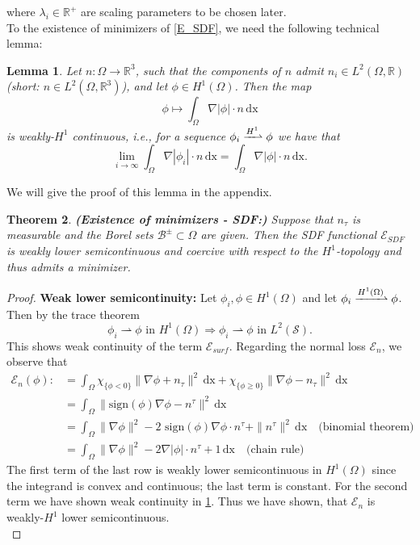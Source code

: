 \documentclass[12pt,openany]{book}
\newcommand{\R}{\mathbb{R}}
\def\S{\mathcal{S}}
\theoremstyle{plainnormal}
\newtheorem{theorem}{Theorem}[section]
\newtheorem{lemma}[theorem]{Lemma}
\theoremstyle{remark}
\begin{document}
where $\lambda_i\in\R^+$ are scaling parameters to be chosen later.\\
To the existence of minimizers of \eqref{E_SDF}, we need the following technical lemma: 
\begin{lemma}\label{technicalLemma}
    Let $n: \Omega \rightarrow \R^3$, such that the components of $n$ admit  $n_i\in L^2(\Omega, \R)$ (short: $n\in L^2(\Omega, \R^3)$), and let $\phi\in H^1(\Omega)$. Then the map $$\phi \mapsto \int_\Omega \nabla |\phi|\cdot n \,\mathrm{dx}$$ is weakly-$H^1$ continuous, i.e., for a sequence $\phi_i \xrightharpoonup{H^1}\phi$ we have that $$\lim_{i\rightarrow\infty}\int_\Omega \nabla|\phi_i|\cdot n  \,\mathrm{dx} = \int_\Omega \nabla|\phi|\cdot n\,\mathrm{dx}.$$
\end{lemma}
We will give the proof of this lemma in the appendix.
\begin{theorem}\label{ProofExSDF}\textbf{(Existence of minimizers - SDF:)} 
Suppose that $n_\tau$ is measurable and the Borel sets $\mathcal{B}^{\pm}\subset \Omega$ are given. Then the SDF functional $\mathcal{E}_{SDF}$ is weakly lower semicontinuous and coercive with respect to the $H^1$-topology and thus admits a minimizer. 
\end{theorem}\begin{proof} \textbf{Weak lower semicontinuity:}
Let $\phi_i, \phi \in H^1(\Omega)$ and let $\phi_i \xrightharpoonup{H^1(\Omega)}\phi$. Then by the trace theorem $$\phi_i \rightharpoonup\phi \text{ in }H^1(\Omega) \Rightarrow \phi_i \rightharpoonup\phi \text{ in }L^2(\S).$$
This shows weak continuity of the term $\mathcal{E}_{surf}$. Regarding the normal loss $\mathcal{E}_n$, we observe that \begin{align*}
    \mathcal{E}_n(\phi) :&= \int_\Omega \chi_{\{\phi < 0\}} \|\nabla \phi + n_\tau\|^2 \,\mathrm{dx} + \chi_{\{\phi \geq 0\}} \|\nabla \phi - n_\tau\|^2 \,\mathrm{dx}\\&= \int_\Omega \|\text{sign}(\phi) \nabla \phi - n^\tau\|^ 2\,\mathrm{dx}\\
    & =\int_\Omega \|\nabla \phi\|^2  -2 \text{ sign} (\phi) \nabla \phi \cdot n^\tau  + \|n^\tau\|^2 \,\mathrm{dx} \quad \text{(binomial theorem)}\\
    &= \int_\Omega \|\nabla \phi\|^2  -2 \nabla |\phi| \cdot n^\tau  + 1 \,\mathrm{dx} \quad \text{(chain rule)}
\end{align*}
The first term of the last row is weakly lower semicontinuous in $H^1(\Omega)$ since the integrand is convex and continuous; the last term is constant. For the second term we have shown weak continuity in \cref{technicalLemma}. Thus we have shown, that $\mathcal{E}_n$ is weakly-$H^1$ lower semicontinuous.\\

\end{proof}
\end{document}
